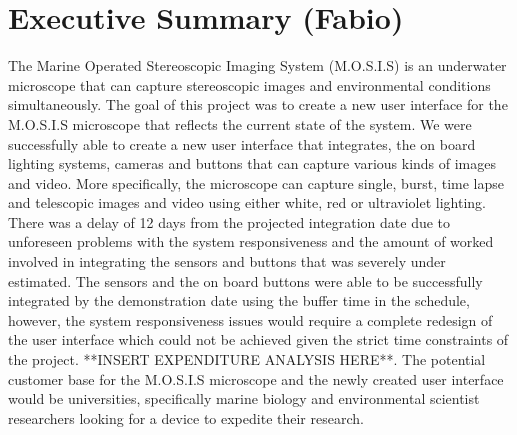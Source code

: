 \section*{Executive Summary (Fabio)}
\begin{spacing}{1.5}
The Marine Operated Stereoscopic Imaging System (M.O.S.I.S) is an underwater microscope that can capture stereoscopic images and environmental conditions simultaneously. The goal of this project was to create a new user interface for the M.O.S.I.S microscope that reflects the current state of the system. We were successfully able to create a new user interface that integrates, the on board lighting systems, cameras and buttons that can capture various kinds of images and video. More specifically, the microscope can capture single, burst, time lapse and telescopic images and video using either white, red or ultraviolet lighting. There was a delay of 12 days from the projected integration date due to unforeseen problems with the system responsiveness and the amount of worked involved in integrating the sensors and buttons that was severely under estimated. The sensors and the on board buttons were able to be successfully integrated by the demonstration date using the buffer time in the schedule, however, the system responsiveness issues would require a complete redesign of the user interface which could not be achieved given the strict time constraints of the project. **INSERT EXPENDITURE ANALYSIS HERE**. The potential customer base for the M.O.S.I.S microscope and the newly created user interface would be universities, specifically marine biology and environmental scientist researchers looking for a device to expedite their research.
\end{spacing}